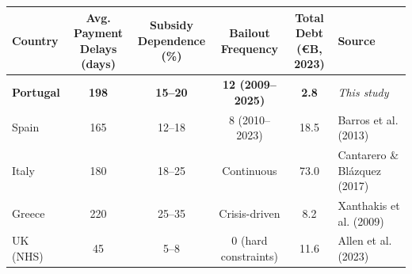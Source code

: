 \begin{tabular}{lccccl}
\toprule
Country & \makecell{Avg. Payment\\Delays (days)} & \makecell{Subsidy\\Dependence (\%)} & \makecell{Bailout\\Frequency} & \makecell{Total Debt\\(€B, 2023)} & Source \\
\midrule
\textbf{Portugal} & \textbf{198} & \textbf{15--20} & \textbf{12 (2009--2025)} & \textbf{2.8} & \textit{This study} \\
\addlinespace
Spain & 165 & 12--18 & 8 (2010--2023) & 18.5 & Barros et al. (2013) \\
Italy & 180 & 18--25 & Continuous & 73.0 & Cantarero \& Blázquez (2017) \\
Greece & 220 & 25--35 & Crisis-driven & 8.2 & Xanthakis et al. (2009) \\
UK (NHS) & 45 & 5--8 & 0 (hard constraints) & 11.6 & Allen et al. (2023) \\
\bottomrule
\end{tabular}
